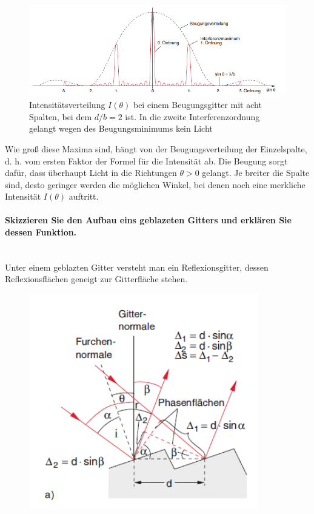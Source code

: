\documentclass[a4paper, 11pt, ngerman, parskip=half-]{scrartcl}
\newcommand{\myparagraph}[1]{\paragraph{#1}\mbox{}\\}
\begin{document}
\begin{figure}[H]
    \centering
    \includegraphics[width=\linewidth]{image/19/3}
    \caption{Intensitätsverteilung $I(\theta)$ bei einem Beugungsgitter mit acht Spalten, bei dem $d/b = 2$ ist. In die zweite Interferenzordnung gelangt wegen des Beugungsminimums kein Licht}
\end{figure}

Wie groß diese Maxima sind, hängt von der Beugungsverteilung der Einzelspalte, d. h. vom ersten Faktor der Formel für die Intensität ab. Die Beugung sorgt dafür, dass überhaupt Licht in die Richtungen $\theta > 0$ gelangt. Je breiter die Spalte sind, desto geringer werden die möglichen Winkel, bei denen noch eine merkliche Intensität $I(\theta)$ auftritt.

\myparagraph{Skizzieren Sie den Aufbau eins geblazeten Gitters und erklären Sie dessen Funktion.}

Unter einem geblazten Gitter versteht man ein Reflexionsgitter, dessen Reflexionsflächen geneigt zur Gitterfläche stehen.

\begin{figure}[H]
    \centering
    \includegraphics[width=10cm]{image/19/4.1}
\end{figure}
\end{document}
